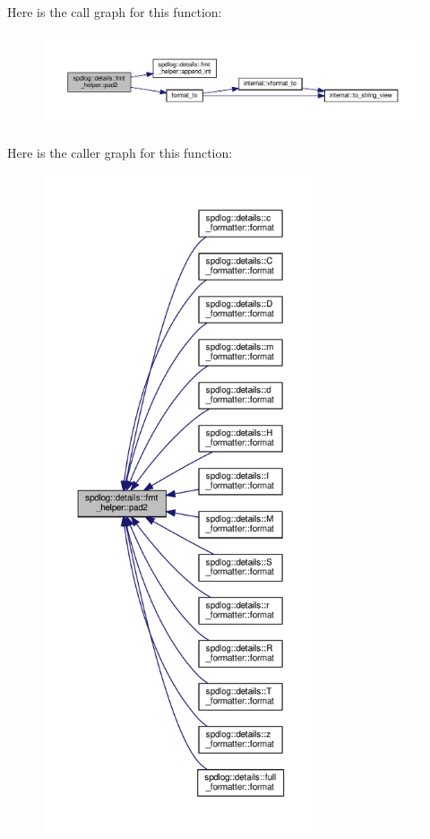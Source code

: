 Here is the call graph for this function\+:
\nopagebreak
\begin{figure}[H]
\begin{center}
\leavevmode
\includegraphics[width=350pt]{namespacespdlog_1_1details_1_1fmt__helper_ae8d7b70c5b54338c0903cf494b06404a_cgraph}
\end{center}
\end{figure}
Here is the caller graph for this function\+:
\nopagebreak
\begin{figure}[H]
\begin{center}
\leavevmode
\includegraphics[height=550pt]{namespacespdlog_1_1details_1_1fmt__helper_ae8d7b70c5b54338c0903cf494b06404a_icgraph}
\end{center}
\end{figure}
\mbox{\label{namespacespdlog_1_1details_1_1fmt__helper_af739ecce102d47ff08a0f344a96897d9}} 
